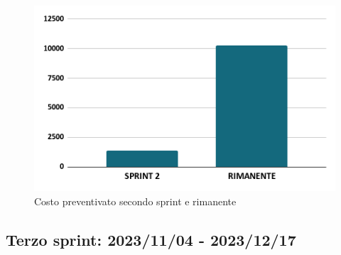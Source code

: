 \begin{figure}[h!]
    \centering
    \includegraphics[width=\textwidth]{prev2costo.png}
    \caption{Costo preventivato secondo sprint e rimanente}
    \label{fig:preventivocostosecondosprint}
\end{figure}


\newpage
\subsection{Terzo sprint: 2023/11/04 - 2023/12/17}
